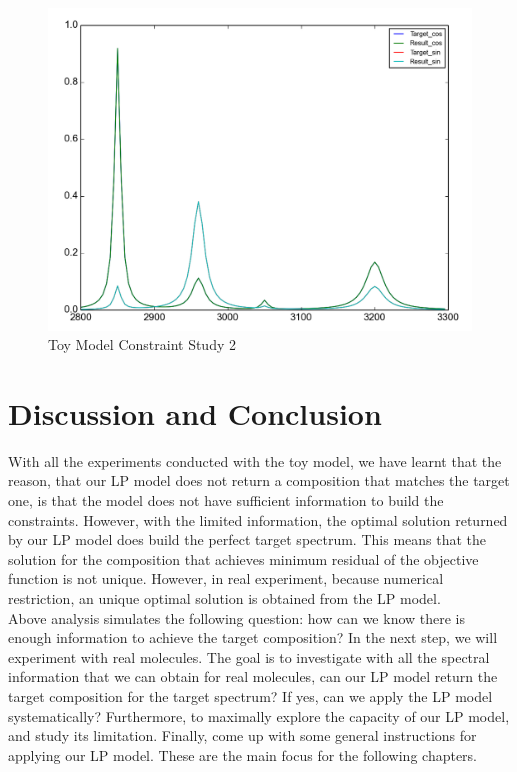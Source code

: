 \begin{figure}[!ht] \label{fig:3.6}
\centering
\includegraphics[scale=0.3]{Figures/toy_model_result_plotting_ir_sin_10candi_constraint_study_experiment5.png} 
\caption{Toy Model Constraint Study 2}
\end{figure}

\section{Discussion and Conclusion}
With all the experiments conducted with the toy model, we have learnt that the reason, that our LP model does not return a composition that matches the target one, is that the model does not have sufficient information to build the constraints. However, with the limited information, the optimal solution returned by our LP model does build the perfect target spectrum. This means that the solution for the composition that achieves minimum residual of the objective function is not unique. However, in real experiment, because numerical restriction, an unique optimal solution is obtained from the LP model. \\

Above analysis simulates the following question: how can we know there is enough information to achieve the target composition? In the next step, we will experiment with real molecules. The goal is to investigate with all the spectral information that we can obtain for real molecules, can our LP model return the target composition for the target spectrum? If yes, can we apply the LP model systematically? Furthermore, to maximally explore the capacity of our LP model, and study its limitation. Finally, come up with some general instructions for applying our LP model. These are the main focus for the following chapters.\\

		

		 



